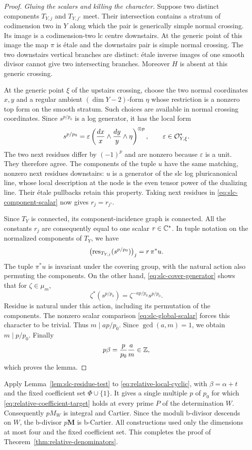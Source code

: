 \begin{proof}
\smallskip
\noindent\emph{Gluing the scalars and killing the character.}
Suppose two distinct components $T_{Y,j}$ and $T_{Y,j'}$ meet.  Their
intersection contains a stratum of codimension two in $Y$ along which
the pair is generically simple normal crossing.  Its image is a
codimension-two lc centre downstairs.  At the generic point of this
image the map $\pi$ is \'{e}tale and the downstairs pair is simple
normal crossing.  The two downstairs vertical branches are distinct:
\'{e}tale inverse images of one smooth divisor cannot give two
intersecting branches.  Moreover $H$ is absent at this generic
crossing.

At the generic point $\xi$ of the upstairs crossing, choose the two
normal coordinates $x,y$ and a regular ambient $(\dim Y-2)$-form
$\eta$ whose restriction is a nonzero top form on the smooth stratum.
Such choices are available in normal crossing coordinates.  Since
$s^{p/p_0}$ is a log generator, it has the local form
\[
 s^{p/p_0}
   =\varepsilon
      \left(\frac{dx}{x}\wedge\frac{dy}{y}\wedge\eta\right)^{\otimes p},
 \qquad \varepsilon\in\mathcal O_{Y,\xi}^*.
\]
The two next residues differ by $(-1)^p$ and are nonzero because
$\varepsilon$ is a unit.  They therefore agree.  The components of
the tuple $u$ have the same matching, nonzero next residues downstairs:
$u$ is a generator of the slc log pluricanonical line, whose local
description at the node is the even tensor power of the dualizing
line.  Their \'{e}tale pullbacks retain this property.  Taking next
residues in \eqref{eq:slc-component-scalar} now gives $r_j=r_{j'}$.

Since $T_Y$ is connected, its component-incidence graph is connected.
All the constants $r_j$ are consequently equal to one scalar
$r\in\mathbb C^*$.  In tuple notation on the normalized components of $T_Y$,
we have
\begin{equation}
 \label{eq:slc-global-scalar}
 \bigl(\operatorname{res}_{T_{Y,j}}(s^{p/p_0})\bigr)_j
     =r\,\pi^*u.
\end{equation}
The tuple $\pi^*u$ is invariant under the covering group, with the
natural action also permuting the components.  On the other hand,
\eqref{eq:slc-cover-generator} shows that for $\zeta\in\mu_m$,
\[
 \zeta^*(s^{p/p_0})=\zeta^{-ap/p_0}s^{p/p_0}.
\]
Residue is natural under this action, including its permutation of the
components.  The nonzero scalar comparison
\eqref{eq:slc-global-scalar} forces this character to be trivial.
Thus $m\mid ap/p_0$.  Since $\gcd(a,m)=1$, we obtain
$m\mid p/p_0$.  Finally
\[
 p\beta=\frac{p}{p_0}\frac{a}{m}\in\mathbb Z,
\]
which proves the lemma.
\end{proof}

Apply Lemma~\ref{lem:slc-residue-test} to
\eqref{eq:relative-local-cyclic}, with $\beta=\alpha+t$ and the fixed
coefficient set $\Phi\cup\{1\}$.  It gives a single multiple $p$ of $p_0$
for which \eqref{eq:relative-coefficient-target} holds at every prime
$P$ of the determination $W$.  Consequently $pM_W$ is integral and
Cartier.  Since the moduli b-divisor descends on $W$, the b-divisor
$p\mathbf M$ is b-Cartier.  All constructions used only the dimensions
at most four and the fixed coefficient set.  This completes the proof
of Theorem~\ref{thm:relative-denominators}.
